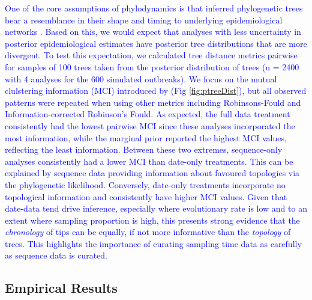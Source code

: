 \documentclass{article}
\begin{document}
\textcolor{blue}{One of the core assumptions of phylodynamics is that inferred phylogenetic trees bear a resemblance in their shape and timing to underlying epidemiological networks \citep{featherstone_epidemiological_2022}. Based on this, we would expect that analyses with less uncertainty in posterior epidemiological estimates have posterior tree distributions that are more divergent. To test this expectation, we calculated tree distance metrics pairwise for samples of 100 trees taken from the posterior distribution of trees (n = 2400 with 4 analyses for the 600 simulated outbreaks). We focus on the mutual clulstering information (MCI) introduced by \citet{smith_information_2020} (Fig \ref{fig:ptreeDist}), but all observed patterns were repeated when using other metrics including Robinsons-Fould and Information-corrected Robinson's Fould. As expected, the full data treatment consistently had the lowest pairwise MCI since these analyses incorporated the most information, while the marginal prior reported the highest MCI values, reflecting the least information. Between these two extremes, sequence-only analyses consistently had a lower MCI than date-only treatments. This can be explained by sequence data providing information about favoured topologies via the phylogenetic likelihood. Conversely, date-only treatments incorporate no topological information and consistently have higher MCI values. Given that date-data tend drive inference, especially where evolutionary rate is low and to an extent where sampling proportion is high, this presents strong evidence that the \textit{chronology} of tips can be equally, if not more informative than the \textit{topology} of trees. This highlights the importance of curating sampling time data as carefully as sequence data is curated.}

\subsection*{Empirical Results}
\end{document}
